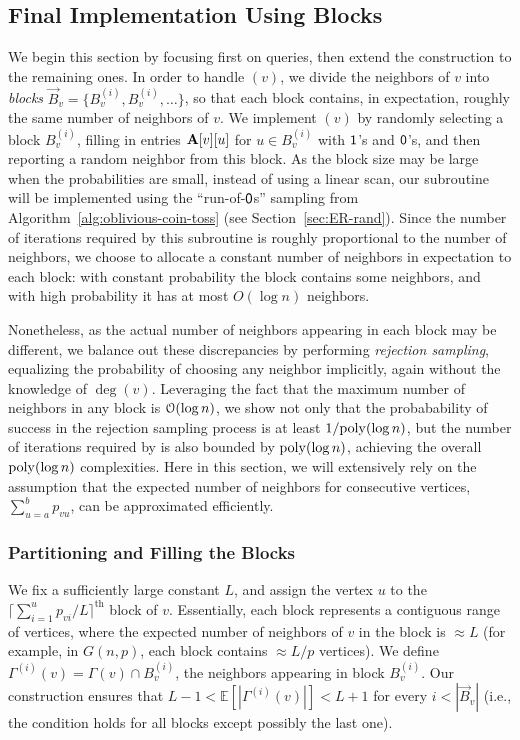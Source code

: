 \subsection{Final Implementation Using Blocks}
\label{sec:blocks}
We begin this section by focusing first on  queries, then extend the construction to the remaining ones.
In order to handle $(v)$, we divide the neighbors of $v$ into \emph{blocks} $\vec B_v = \{ B^{(i)}_v, B^{(i)}_v,\ldots\}$,
so that each block contains, in expectation, roughly the same number of neighbors of $v$.
We implement $(v)$ by randomly selecting a block $B^{(i)}_v$,
filling in entries $\mathbf{A}[v][u]$ for $u \in B^{(i)}_v$ with $\mathsf{1}$'s and $\mathsf{0}$'s, and then reporting a random neighbor from this block.
As the block size may be large when the probabilities are small, instead of using a linear scan,
our  subroutine will be implemented using the ``run-of-$\mathsf{0}$s'' sampling from  Algorithm~\ref{alg:oblivious-coin-toss}
(see Section~\ref{sec:ER-rand}).
Since the number of iterations required by this subroutine is roughly proportional to the number of neighbors,
we choose to allocate a constant number of neighbors in expectation to each block:
with constant probability the block contains some neighbors, and with high probability it has at most $O(\log n)$ neighbors.

Nonetheless, as the actual number of neighbors appearing in each block may be different,
we balance out these discrepancies by performing \emph{rejection sampling}, equalizing the probability of choosing any neighbor implicitly,
again without the knowledge of $\deg(v)$.
Leveraging the fact that the maximum number of neighbors in any block is $\Bo(\log n)$,
we show not only that the probabability of success in the rejection sampling process is at least $1/\mathrm{poly}(\log n)$,
but the number of iterations required by  is also bounded by $\mathrm{poly}(\log n)$, achieving the overall $\mathrm{poly}(\log n)$ complexities.
Here in this section, we will extensively rely on the assumption that the expected number of neighbors for consecutive vertices,
$\sum_{u=a}^b p_{vu}$, can be approximated efficiently.

\subsubsection{Partitioning and Filling the Blocks}
\label{sec:block_partitioning_and_filling}
We fix a sufficiently large constant $L$, and assign the vertex $u$ to the $\lceil\sum^{u}_{i=1} p_{vi}/L\rceil^\textrm{th}$ block of $v$.
Essentially, each block represents a contiguous range of vertices, where the expected number of neighbors of $v$ in the block is $\approx L$
(for example, in $G(n,p)$, each block contains $\approx L/p$ vertices).
We define $\Gamma^{(i)}(v) = \Gamma(v) \cap B^{(i)}_v$, the neighbors appearing in block $B^{(i)}_v$.
Our construction ensures that $L-1 < \mathbb E \left[|\Gamma^{(i)}(v)|\right] < L+1$ for every $i < |\vec B_v|$
(i.e., the condition holds for all blocks except possibly the last one).

